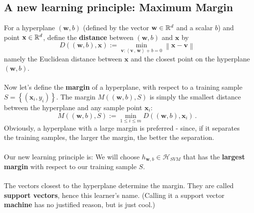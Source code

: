 \documentclass[11pt]{article}
\newcommand{\norm}[1]{\left\| #1\right\|}
\newcommand{\Hc}{\mathcal{H}}
\newcommand{\innerr}[2]{{\left\langle #1\,,\,#2 \right\rangle}}
\newcommand{\VV}[1]{\mathbf{#1}}
\begin{document}
\subsection{A new learning principle: Maximum Margin}


For a hyperplane $(\VV{w},b)$ (defined by the vector $\VV{w}\in\reals^d$ and a
scalar $b$) and
point $\VV{x}\in\reals^d$, define the {\bf distance} between $(\VV{w},b)$ and
$\VV{x}$ by 
\[
  D( (\VV{w},b) , \VV{x}) := \min_{\VV{v}:\innerr{\VV{v}}{\VV{w}}  +b=0  } \norm{\VV{x}-\VV{v}}
\]
namely the Euclidean distance between $\VV{x}$ and the closest point on the
hyperplane $(\VV{w},b)$.
\\~\\
Now let's define the {\bf margin} of  a hyperplane, with respect to a training
sample $S=\left\{ \left( \VV{x}_i,y_i \right) \right\}$. The margin $M\left(
   (\VV{w},b) , S
 \right)$ is simply the smallest distance between the hyperplane and any sample
 point $\VV{x}_i$:
\[
  M( (\VV{w},b) , S) := \min_{1\leq i\leq m} D( (\VV{w},b) , \VV{x}_i)\,.  
\]
Obviously, a hyperplane with a large margin is preferred - since, if it
separates the training samples, the larger the margin, the better the
separation.
\\~\\
Our new learning principle is: 
 We will choose $h_{\VV{w},b} \in
 \Hc_{SVM}$ that has the {\bf largest margin} with respect to our training sample $S$. 
\\~\\
The vectors closest to the hyperplane determine the margin. They are called {\bf
support vectors}, hence this learner's name. (Calling it a support vector {\bf
machine} has no justified reason, but is just cool.)
\end{document}

